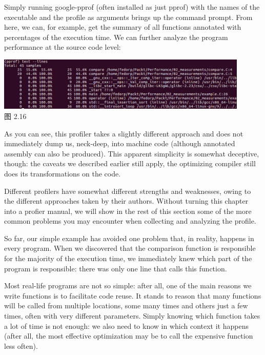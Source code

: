 Simply running google-pprof (often installed as just pprof) with the names of the executable and the profile as arguments brings up the command prompt. From here, we can, for example, get the summary of all functions annotated with percentages of the execution time. We can further analyze the program performance at the source code level:

\begin{center}
\includegraphics[width=0.9\textwidth]{content/1/chapter2/images/16.jpg}\\
图 2.16
\end{center}

As you can see, this profiler takes a slightly different approach and does not immediately dump us, neck-deep, into machine code (although annotated assembly can also be produced). This apparent simplicity is somewhat deceptive, though: the caveats we described earlier still apply, the optimizing compiler still does its transformations on the code.

Different profilers have somewhat different strengths and weaknesses, owing to the different approaches taken by their authors. Without turning this chapter into a profier manual, we will show in the rest of this section some of the more common problems you may encounter when collecting and analyzing the profile.


So far, our simple example has avoided one problem that, in reality, happens in every program. When we discovered that the comparison function is responsible for the majority of the execution time, we immediately knew which part of the program is responsible: there was only one line that calls this function.

Most real-life programs are not so simple: after all, one of the main reasons we write functions is to facilitate code reuse. It stands to reason that many functions will be called from multiple locations, some many times and others just a few times, often with very different parameters. Simply knowing which function takes a lot of time is not enough: we also need to know in which context it happens (after all, the most effective optimization may be to call the expensive function less often).

